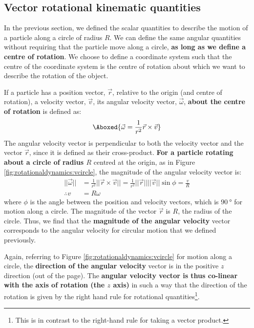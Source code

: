 \subsection{Vector rotational kinematic quantities}
In the previous section, we defined the scalar quantities to describe the motion of a particle along a circle of radius $R$. We can define the same angular quantities without requiring that the particle move along a circle, \textbf{as long as we define a centre of rotation}. We choose to define a coordinate system such that the centre of the coordinate system is the centre of rotation about which we want to describe the rotation of the object.

If a particle has a position vector, $\vec r$, relative to the origin (and centre of rotation), a velocity vector, $\vec v$, its angular velocity vector, $\vec \omega$, \textbf{about the centre of rotation} is defined as:
\begin{align}
\Aboxed{\vec \omega = \frac{1}{r^2} \vec r \times \vec v}
\end{align}
The angular velocity vector is perpendicular to both the velocity vector and the vector $\vec r$, since it is defined as their cross-product. \textbf{For a particle rotating about a circle of radius $R$} centred at the origin, as in Figure \ref{fig:rotationaldynamics:vcircle}, the magnitude of the angular velocity vector is:
\begin{align*}
||\vec\omega|| &=\frac{1}{r^2} || \vec r \times \vec v||= \frac{1}{r^2}||\vec r|| ||\vec v||\sin\phi= \frac{v}{R}\\
\therefore v &= R\omega
\end{align*}
where $\phi$ is the angle between the position and velocity vectors, which is $\SI{90}{\degree}$ for motion along a circle. The magnitude of the vector $\vec r$ is $R$, the radius of the circle. Thus, we find that the \textbf{magnitude of the angular velocity} vector corresponds to the angular velocity for circular motion that we defined previously.

Again, referring to Figure \ref{fig:rotationaldynamics:vcircle} for motion along a circle, the \textbf{direction of the angular velocity} vector is in the positive $z$ direction (out of the page). The \textbf{angular velocity vector is thus co-linear with the axis of rotation (the $z$ axis)} in such a way that the direction of the rotation is given by the right hand rule for rotational quantities\footnote{This is in contrast to the right-hand rule for taking a vector product.}. 

